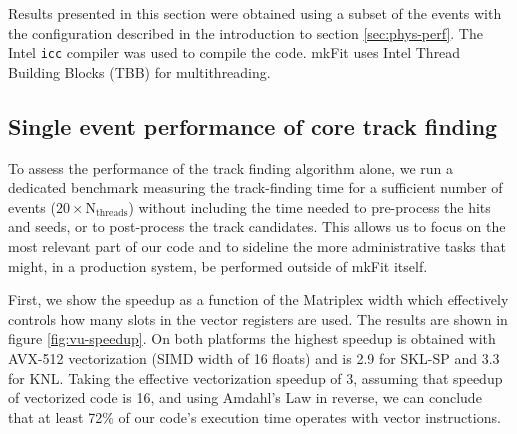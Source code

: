 \documentclass{webofc}
\def\mkfit{mkFit\xspace}
\def\stt#1{{\small\texttt{#1}}}
\begin{document}
Results presented in this section were obtained using a subset of the 
events with the configuration described in the introduction to section 
\ref{sec:phys-perf}. The Intel \stt{icc} compiler was used to compile the
code. \mkfit uses Intel Thread Building Blocks (TBB) for multithreading.


\subsection{Single event performance of core track finding}

To assess the performance of the track finding algorithm alone,
we run a dedicated benchmark measuring the track-finding time for
a sufficient number of events ($20 \times \mathrm{N_{threads}}$)
without including the time needed
to pre-process the hits and seeds, or to post-process the track
candidates. This allows us to focus on the most relevant part of our code and
to sideline the more administrative tasks that might, in a production system,
be performed outside of \mkfit itself.

First, we show the speedup as a function of the Matriplex width which
effectively controls how many slots in the vector registers are used. The
results are shown in figure \ref{fig:vu-speedup}. On both platforms the highest
speedup is obtained with AVX-512 vectorization (SIMD width of 16 floats) and
is 2.9 for SKL-SP and 3.3 for KNL. Taking the effective
vectorization speedup of 3, assuming that speedup of vectorized code is 16, and using
Amdahl's Law in reverse, we can conclude that at least 72\% of our code's
execution time operates with vector instructions.
\end{document}
